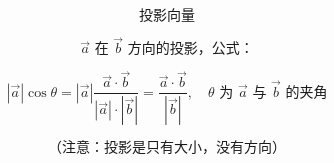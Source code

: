 \[
	\text{投影向量}
\]

\[
	\vec a \text{ 在 } \vec b \text{ 方向的投影，公式：}
\]

\[
	|\vec a|\cos\theta
	=
	|\vec a|\frac{\vec a\cdot\vec b}{|\vec a|\cdot|\vec b|}
	=
	\frac{\vec a\cdot\vec b}{|\vec b|},
	\quad
	\theta \text{ 为 } \vec a \text{ 与 } \vec b \text{ 的夹角}
\]

\[
	\text{（注意：投影是只有大小，没有方向）}
\]